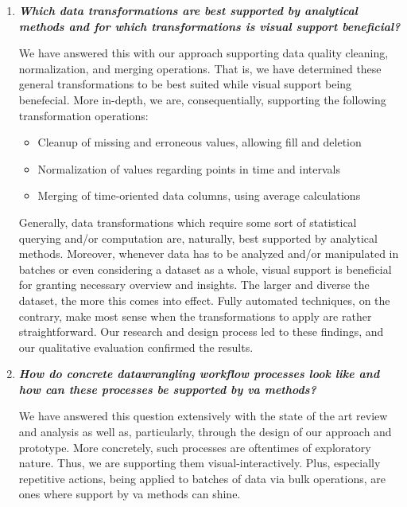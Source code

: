 \begin{enumerate}
  \item \emph{\textbf{Which data transformations are best supported by analytical methods and for which transformations is visual support beneficial?}}

  We have answered this with our approach supporting data quality cleaning, normalization, and merging operations.
  That is, we have determined these general transformations to be best suited while visual support being benefecial.
  More in-depth, we are, consequentially, supporting the following transformation operations:
  \begin{itemize}
    \item Cleanup of missing and erroneous values, allowing fill and deletion
    \item Normalization of values regarding points in time and intervals
    \item Merging of time-oriented data columns, using average calculations
  \end{itemize}
  Generally, data transformations which require some sort of statistical querying and/or computation are, naturally, best supported by analytical methods.
  Moreover, whenever data has to be analyzed and/or manipulated in batches or even considering a dataset as a whole, visual support is beneficial for granting necessary overview and insights.
  The larger and diverse the dataset, the more this comes into effect.
  Fully automated techniques, on the contrary, make most sense when the transformations to apply are rather straightforward.
  Our research and design process led to these findings, and our qualitative evaluation confirmed the results.
  \item \emph{\textbf{How do concrete \gls{datawrangling} workflow processes look like and how can these processes be supported by \gls{va} methods?}}

  We have answered this question extensively with the state of the art review and analysis as well as, particularly, through the design of our approach and prototype.
  More concretely, such processes are oftentimes of exploratory nature.
  Thus, we are supporting them visual-interactively.
  Plus, especially repetitive actions, being applied to batches of data via bulk operations, are ones where support by \gls{va} methods can shine.


\end{enumerate}
